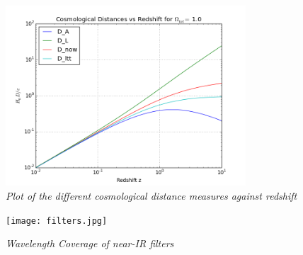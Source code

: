 \documentclass{literature}
\begin{document}
\begin{figure}[!htp]
\centering
\includegraphics[width=0.8\textwidth]{cosmo_dist.png}
\caption{\footnotesize{\emph{Plot of the different cosmological distance measures against redshift}}}
\label{fig:cosmo_dist}
\end{figure}

\begin{figure}[!htp]
\centering
\texttt{[image: filters.jpg]}
\caption{\footnotesize{\emph{Wavelength Coverage of near-IR filters}}}
\label{fig:cosmo_dist}
\end{figure}
\end{document}
